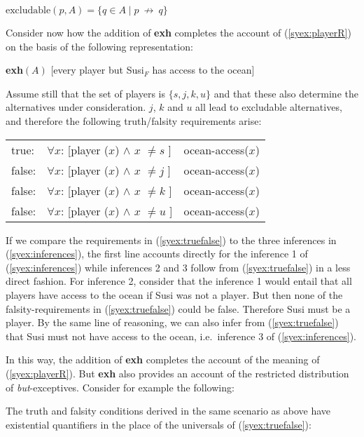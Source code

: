 \documentclass[output=paper]{langscibook}
\begin{document}
\ea \label{syexcludable}
$\text{excludable}(p,A) = \{q \in A \mid p\  \not\rightarrow\ q\}$\z


Consider now how the addition of \textbf{exh} completes the account of (\ref{syex:playerR}) on the basis of the following representation:

\ea \label{syex:playerLF}
     \textbf{exh}$(A)$ [every player but Susi$_F$ has access to the ocean]\z

Assume still that the set of players is $\{s, j, k, u\}$ and that these also determine the alternatives under consideration.
$j$, $k$ and $u$ all lead to excludable alternatives, and therefore the following truth/falsity requirements arise:

\ea \label{syex:truefalse}
    \begin{tabular}[t]{@{}l@{~}l@{~$\rightarrow$~}l@{}}
    true:  & $\forall x$: [player ($x$) $\land$ $x$ $\neq s$ ] & ocean-access($x$)\\
    false: & $\forall x$: [player ($x$) $\land$ $x$ $\neq j$ ] & ocean-access($x$)\\
    false: & $\forall x$: [player ($x$) $\land$ $x$ $\neq k$ ] & ocean-access($x$)\\
    false: & $\forall x$: [player ($x$) $\land$ $x$ $\neq u$ ] & ocean-access($x$)\\
    \end{tabular}
\z

If we compare the requirements in (\ref{syex:truefalse}) to the three inferences in (\ref{syex:inferences}), the first line accounts directly for the inference 1 of (\ref{syex:inferences}) while inferences 2 and 3  follow from (\ref{syex:truefalse}) in a less direct fashion.
For inference 2, consider that the inference 1 would entail that all players have access to the ocean if Susi was not a player.
But then none of the falsity-requirements in (\ref{syex:truefalse}) could be false. Therefore Susi must be a player.
By the same line of reasoning, we can also infer from (\ref{syex:truefalse}) that Susi must not have access to the ocean, i.e.\ inference 3 of (\ref{syex:inferences}).

In this way, the addition of \textbf{exh} completes the account of the meaning of (\ref{syex:playerR}).  
But \textbf{exh} also provides an account of the restricted distribution of \emph{but}-exceptives. Consider for example the following:

\z

The truth and falsity conditions derived in the same scenario as above have existential quantifiers in the place of the universals of (\ref{syex:truefalse}):
\end{document}
